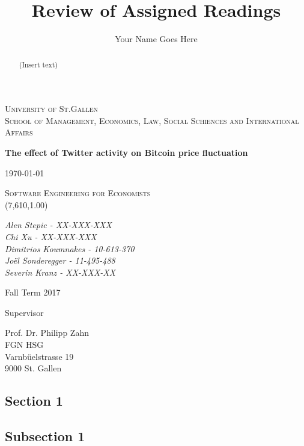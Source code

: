 \documentclass[a4paper,american,12pt]{article}
\title{Review of Assigned Readings}
\author{Your Name Goes Here}
\begin{document}
    \begin{titlepage}
        \centering
        {\scshape\LARGE University of St.Gallen \\ \large School of Management, Economics, Law, Social Schiences and International Affairs \par}
        \vspace{2cm}
        {\huge\bfseries The effect of Twitter activity on Bitcoin price fluctuation  \par}
		\vspace{1.5cm}        
        {\large\today\par}
        \vspace{1.5cm}
        {\scshape\Large Software Engineering for Economists \\(7,610,1.00) \par}
        \vspace{1.5cm}
        {\itshape\large Alen Stepic - XX-XXX-XXX \\Chi Xu - XX-XXX-XXX \\Dimitrios Koumnakes - 10-613-370 \\Joël Sonderegger - 11-495-488 \\Severin Kranz - XX-XXX-XX \par}
        
        \begin{spacing}{1.5}
        \vspace{1cm}
        {Fall Term 2017 \par}
        \vspace{1cm}
        Supervisor\\
        {Prof. Dr. Philipp Zahn\\ FGN HSG\\ Varnbüelstrasse 19\\ 9000 St. Gallen \par} 
        \end{spacing}
    \end{titlepage}
    
    \begin{abstract}
    \begin{spacing}{1.5}
    
  (Insert text)

    \end{spacing}
    
    \end{abstract}

    \clearpage
    \tableofcontents
    
    \clearpage
    
    \listoffigures
    
    \clearpage

\begin{spacing}{1.2}
\cleardoublepage{}
\section{Section 1}

\subsection{Subsection 1}


\end{spacing}
\clearpage

\printbibliography
\end{document}
